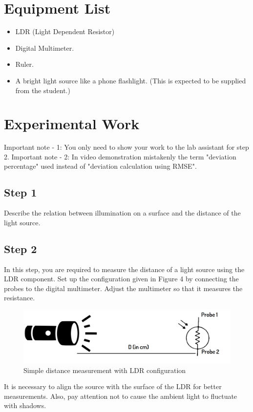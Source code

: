 \documentclass[letterpaper,12pt]{article}
\begin{document}
\section*{Equipment List}
\begin{itemize}
	\item LDR (Light Dependent Resistor)
	\item Digital Multimeter.
	\item Ruler.
	\item A bright light source like a phone flashlight. (This is expected to be supplied from the student.)
\end{itemize}
\section*{Experimental Work}
Important note - 1: You only need to show your work to the lab assistant for step 2.
Important note - 2: In video demonstration mistakenly the term "deviation percentage" used instead of "deviation calculation using RMSE".
\subsection*{Step 1}
Describe the relation between illumination on a surface and the distance of the light source.
\subsection*{Step 2}
In this step, you are required to measure the distance of a light source using the LDR component. Set up the configuration given in Figure 4 by connecting the probes to the digital multimeter. Adjust the multimeter so that it measures the resistance. 
\begin{figure}[H]
	\centering
	\includegraphics[width=1\textwidth]{setup.png}
	\caption{Simple distance measurement with LDR configuration}
\end{figure}
It is necessary to align the source with the surface of the LDR for better measurements. Also, pay attention not to cause the ambient light to fluctuate with shadows.
\end{document}
